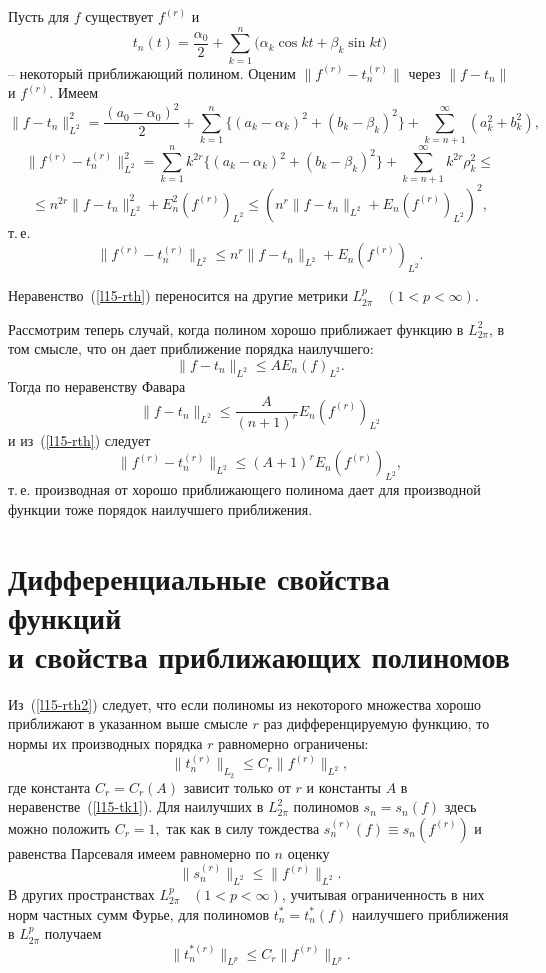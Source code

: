 Пусть для $f$ существует $f^{(r)}$ и
$$
t_n(t)=\frac{\alpha_0}{2}+\sum\limits_{k=1}^n {(}\alpha_k\cos kt+\beta_k \sin kt{)}
$$
-- некоторый приближающий полином. Оценим $\|f^{(r)}-t_n^{(r)}\|$
через $\|f-t_n\|$ и $f^{(r)}.$ Имеем
$$
\|f-t_n\|_{{L^2}}^2=\frac{(a_0-\alpha_0)^2}{2}+\sum\limits_{k=1}^n
\{(a_k-\alpha_k)^2+(b_k-\beta_k)^2\}+\sum\limits_{k=n+1}^{\infty}(a_k^2+b_k^2),
$$
$$
\|f^{(r)}-t_n^{(r)}\|_{{L^2}}^2=\sum\limits_{k=1}^n k^{2r} \{
(a_k-\alpha_k)^2+(b_k-\beta_k)^2\}+\sum\limits_{k=n+1}^{\infty}k^{2r}\rho_k^2
\le
$$
$$
\le n^{2r}\|f-t_n\|_{{L^2}}^2+E_n^2(f^{(r)})_{{L^2}}\le
\left( n^{r}\|f-t_n\|_{{L^2}}+E_n(f^{(r)})_{{L^2}}\right)^2,
$$
т.\,е.
\begin{equation}\label{l15-rth}
\|f^{(r)}-t_n^{(r)}\|_{{L^2}}\le n^r \|f-t_n\|_{{L^2}}+E_n
(f^{(r)})_{{L^2}}.
\end{equation}

\begin{Remark}
Неравенство~(\ref{l15-rth}) переносится на другие метрики {$L_{2\pi}^p$~ $(1<p<\infty)$}.
\end{Remark}

Рассмотрим теперь случай, когда полином хорошо
приближает функцию {в $L_{2\pi}^2$, в} {том смысле, что} он дает приближение порядка
наилучшего:
\begin{equation}\label{l15-tk1}
\|f-t_n\|_{{L^2}}\le AE_n(f)_{{L^2}}.
\end{equation}
Тогда по неравенству Фавара
$$
\|f-t_n\|_{{L^2}}\le \frac{A}{(n+1)^r}E_n(f^{(r)})_{{L^2}}
$$
и из~(\ref{l15-rth}) следует
\begin{equation}\label{l15-rth2}
\|f^{(r)}-t_n^{(r)}\|_{{L^2}}\le
(A+1)^r E_n(f^{(r)})_{{L^2}},
\end{equation}
т.\,е. производная от хорошо приближающего полинома дает для производной функции тоже порядок наилучшего приближения.


\section{Дифференциальные свойства функций \\ и свойства приближающих полиномов}

Из~(\ref{l15-rth2}) следует, что если {полиномы из некоторого множества хорошо приближают в}
{указанном выше смысле} $r$ раз
дифференцируемую функцию, то {нормы их} {производных порядка $r$ равномерно ограничены:}
$$
{\|t_n^{(r)}\|_{L_2}\le  C_r\|f^{(r)}\|_{L^2},}
$$
{где константа $C_r=C_r(A)$ зависит только от $r$ и константы $A$ в неравенстве~(\ref{l15-tk1}).}
Для наилучших {в $L_{2\pi}^2$ полиномов $s_n=s_n(f)$ здесь можно положить $C_r=1,$ так как в}
{силу тождества $s_n^{(r)}(f)\equiv s_n(f^{(r)})$ и равенства Парсеваля имеем равномерно по $n$ оценку}
$$
\|s_n^{(r)}\|_{{L^2}}\le \|f^{(r)}\|_{{L^2}}.
$$
В других пространствах $L_{2\pi}^p$~ $(1<p<\infty)$, учитывая ограниченность в них норм частных сумм Фурье,
для полиномов $t_n^*=t_n^*(f)$ наилучшего
приближения в $L_{2\pi}^p$ получаем
$$
\|t_n^{*(r)}\|_{L^p}\le C_r \|f^{(r)}\|_{L^p}.
$$

